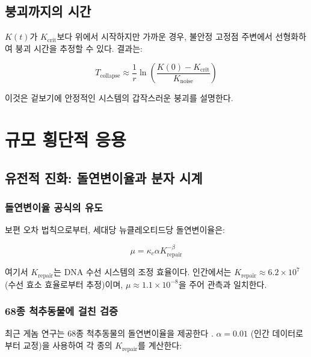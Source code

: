 \documentclass[12pt,a4paper]{article}
\newcommand{\Keffcrit}{K_{\mathrm{crit}}}
\newcommand{\kappac}{\kappa_c}
\theoremstyle{remark}
\begin{document}
	\subsection{붕괴까지의 시간}
	
	\(K(t)\)가 \(\Keffcrit\)보다 위에서 시작하지만 가까운 경우, 불안정 고정점 주변에서 선형화하여 붕괴 시간을 추정할 수 있다. 결과는:
	
	\begin{equation}
		T_{\text{collapse}} \approx \frac{1}{r} \ln\left( \frac{K(0) - \Keffcrit}{K_{\text{noise}}} \right)
		\label{eq:collapse-time}
	\end{equation}
	
	이것은 겉보기에 안정적인 시스템의 갑작스러운 붕괴를 설명한다.
	
	\section{규모 횡단적 응용}
	\label{sec:applications}
	
	\subsection{유전적 진화: 돌연변이율과 분자 시계}
	\label{subsec:genetic}
	
	\subsubsection{돌연변이율 공식의 유도}
	
	보편 오차 법칙으로부터, 세대당 뉴클레오티드당 돌연변이율은:
	
	\begin{equation}
		\mu = \kappac \alpha K_{\text{repair}}^{-\beta}
		\label{eq:mutation-rate}
	\end{equation}
	
	여기서 \(K_{\text{repair}}\)는 DNA 수선 시스템의 조정 효율이다. 인간에서는 \(K_{\text{repair}} \approx 6.2 \times 10^7\) (수선 효소 효율로부터 추정)이며, \(\mu \approx 1.1 \times 10^{-8}\)을 주어 관측과 일치한다.
	
	\subsubsection{68종 척추동물에 걸친 검증}
	
	최근 게놈 연구는 68종 척추동물의 돌연변이율을 제공한다 \cite{Bergeron2023}. \(\alpha = 0.01\) (인간 데이터로부터 교정)을 사용하여 각 종의 \(K_{\text{repair}}\)를 계산한다:
	
\end{document}
